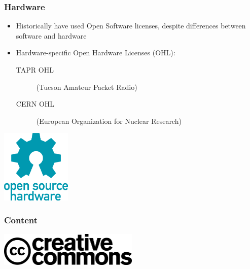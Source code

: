 \documentclass{beamer}
\begin{document}
\begin{frame}
  \frametitle{Hardware}
  \begin{Large}
    \begin{itemize}
    \item Historically have used Open Software licenses, despite
      differences between software and hardware
    \item Hardware-specific Open Hardware Licenses (OHL):
      \begin{description}
      \item[TAPR OHL] (Tucson Amateur Packet Radio)
      \item[CERN OHL] (European Organization for Nuclear Research)
      \end{description}
    \end{itemize}
  \end{Large}

  \begin{center}
    \includegraphics[width=0.25\textwidth]{../img/opensourcehardware}
  \end{center}
\end{frame}

\begin{frame}
  \frametitle{Content}
  \begin{center}
    \includegraphics[width=0.5\textwidth]{../img/cc}
  \end{center}
\end{frame}
\end{document}
